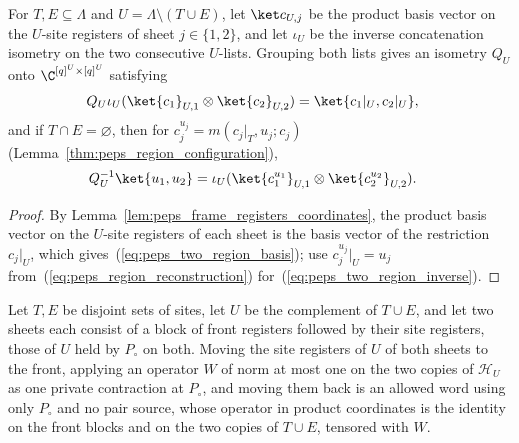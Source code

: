 \begin{lemma}
    \label{thm:peps_two_region_coordinates}
    \leanok
    For $T,E\subseteq\Lambda$ and $U=\Lambda\setminus(T\cup E)$, let
    $\ket c_{U,j}$ be the product basis vector on the $U$-site registers of
    sheet $j\in\{1,2\}$, and let $\iota_U$ be the inverse concatenation
    isometry on the two consecutive $U$-lists. Grouping both lists gives an
    isometry $Q_U$ onto $\C^{[q]^U\times[q]^U}$ satisfying
    \begin{align}
        Q_U\iota_U(\ket{c_1}_{U,1}\otimes\ket{c_2}_{U,2})
         & =\ket{c_1|_U,c_2|_U},
        \label{eq:peps_two_region_basis}
    \end{align}
    and if $T\cap E=\varnothing$, then for $c_j^{u_j}=m(c_j|_T,u_j;c_j)$
    (Lemma~\ref{thm:peps_region_configuration}),
    \begin{align}
        Q_U^{-1}\ket{u_1,u_2}
         & =\iota_U(\ket{c_1^{u_1}}_{U,1}\otimes\ket{c_2^{u_2}}_{U,2}).
        \label{eq:peps_two_region_inverse}
    \end{align}
\end{lemma}

\begin{proof}\leanok
    By Lemma~\ref{lem:peps_frame_registers_coordinates}, the product basis
    vector on the $U$-site registers of each sheet is the basis vector of the
    restriction $c_j|_U$, which gives~(\ref{eq:peps_two_region_basis}); use $c_j^{u_j}|_U=u_j$
    from~(\ref{eq:peps_region_reconstruction}) for~(\ref{eq:peps_two_region_inverse}).
\end{proof}

\begin{lemma}
    \label{lem:lattice_front_correction_word}
    \leanok
    Let $T,E$ be disjoint sets of sites, let $U$ be the complement of $T\cup E$, and
    let two sheets each consist of a block of front registers followed by their site
    registers, those of $U$ held by $P_\circ$ on both. Moving the site registers of
    $U$ of both sheets to the front, applying an operator $W$ of norm at most one on
    the two copies of $\mathcal H_U$ as one private contraction at $P_\circ$, and
    moving them back is an allowed word using only $P_\circ$ and no pair source,
    whose operator in product coordinates is the identity on the front blocks and on
    the two copies of $T\cup E$, tensored with $W$.
\end{lemma}

